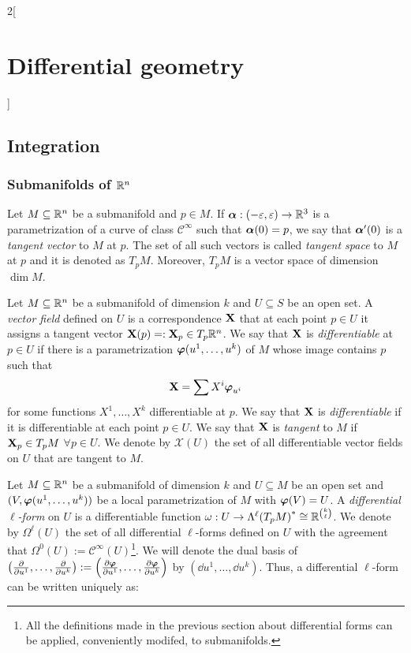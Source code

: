 \documentclass[../../../main_math.tex]{subfiles}
\begin{document}
\begin{multicols}{2}[\section{Differential geometry}]
  \subsection{Integration}
  \subsubsection{Submanifolds of \texorpdfstring{$\mathbb{R}^n$}{Rn}}
  \begin{definition}
    Let $M\subseteq\mathbb{R}^n$ be a submanifold and $p\in M$. If $\boldsymbol{\mathrm{\alpha}}:(-\varepsilon,\varepsilon)\rightarrow\mathbb{R}^3$ is a parametrization of a curve of class $\mathcal{C}^\infty$ such that $\boldsymbol{\mathrm{\alpha}}(0)=p$, we say that $\boldsymbol{\mathrm{\alpha}}'(0)$ is a \emph{tangent vector} to $M$ at $p$. The set of all such vectors is called \emph{tangent space} to $M$ at $p$ and it is denoted as $T_pM$. Moreover, $T_pM$ is a vector space of dimension $\dim M$.
  \end{definition}
  \begin{definition}
    Let $M\subseteq\mathbb{R}^n$ be a submanifold of dimension $k$ and $U\subseteq S$ be an open set. A \emph{vector field} defined on $U$ is a correspondence $\boldsymbol{\mathrm{X}}$ that at each point $p\in U$ it assigns a tangent vector $\boldsymbol{\mathrm{X}}(p)=:\boldsymbol{\mathrm{X}}_p\in T_p\mathbb{R}^n$. We say that $\boldsymbol{\mathrm{X}}$ is \emph{differentiable} at $p\in U$ if there is a parametrization $\boldsymbol{\mathrm{\varphi}}(u^1,\ldots,u^k)$ of $M$ whose image contains $p$ such that $$\boldsymbol{\mathrm{X}}=\sum X^i\boldsymbol{\mathrm{\varphi}}_{u^i}$$ for some functions $X^1,\ldots,X^k$ differentiable at $p$. We say that $\boldsymbol{\mathrm{X}}$ is \emph{differentiable} if it is differentiable at each point $p\in U$. We say that $\boldsymbol{\mathrm{X}}$ is \emph{tangent} to $M$ if $\boldsymbol{\mathrm{X}}_p\in T_pM$ $\forall p\in U$. We denote by $\mathcal{X}(U)$ the set of all differentiable vector fields on $U$ that are tangent to $M$.
  \end{definition}
  \begin{definition}
    Let $M\subseteq\mathbb{R}^n$ be a submanifold of dimension $k$ and $U\subseteq M$ be an open set and $(V,\boldsymbol{\mathrm{\varphi}}(u^1,\ldots,u^k))$ be a local parametrization of $M$ with $\boldsymbol{\mathrm{\varphi}}(V)=U$. A \emph{differential $\ell$-form} on $U$ is a differentiable function $\omega:U\rightarrow\Lambda^\ell{(T_pM)}^*\cong\mathbb{R}^{\binom{k}{\ell}}$. We denote by $\Omega^\ell(U)$ the set of all differential $\ell$-forms defined on $U$ with the agreement that $\Omega^0(U):=\mathcal{C}^\infty(U)$\footnote{All the definitions made in the previous section about differential forms can be applied, conveniently modifed, to submanifolds.}. We will denote the dual basis of $\left(\pdv{}{u^1},\ldots,\pdv{}{u^k}\right):=\left(\pdv{\boldsymbol{\mathrm{\varphi}}}{u^1},\ldots,\pdv{\boldsymbol{\mathrm{\varphi}}}{u^k}\right)$ by $(\dd{u^1},\ldots,\dd{u^k})$. Thus, a differential $\ell$-form can be written uniquely as:

\end{definition}
\end{multicols}
\end{document}
